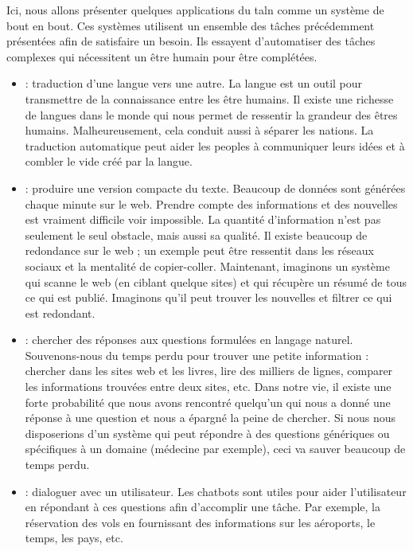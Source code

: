 \documentclass{KodeBook}
\begin{document}
Ici, nous allons présenter quelques applications du \ac{taln} comme un système de bout en bout. 
Ces systèmes utilisent un ensemble des tâches précédemment présentées afin de satisfaire un besoin. 
Ils essayent d'automatiser des tâches complexes qui nécessitent un être humain pour être complétées.
\begin{itemize}
	\item {} : traduction d'une langue vers une autre.
	La langue est un outil pour transmettre de la connaissance entre les être humains. 
	Il existe une richesse de langues dans le monde qui nous permet de ressentir la grandeur des êtres humains.
	Malheureusement, cela conduit aussi à séparer les nations.
	La traduction automatique peut aider les peoples à communiquer leurs idées et à combler le vide créé par la langue. 
	\item {} : produire une version compacte du texte.
	Beaucoup de données sont générées chaque minute sur le web. 
	Prendre compte des informations et des nouvelles est vraiment difficile voir impossible.
	La quantité d'information n'est pas seulement le seul obstacle, mais aussi sa qualité. 
	Il existe beaucoup de redondance sur le web ; un exemple peut être ressentit dans les réseaux sociaux et la mentalité de copier-coller. 
	Maintenant, imaginons un système qui scanne le web (en ciblant quelque sites) et qui récupère un résumé de tous ce qui est publié. 
	Imaginons qu'il peut trouver les nouvelles et filtrer ce qui est redondant.
	
	\item {} : chercher des réponses aux questions formulées en langage naturel.
	Souvenons-nous du temps perdu pour trouver une petite information : chercher dans les sites web et les livres, lire des milliers de lignes, comparer les informations trouvées entre deux sites, etc.
	Dans notre vie, il existe une forte probabilité que nous avons rencontré quelqu'un qui nous a donné une réponse à une question et nous a épargné la peine de chercher.
	Si nous nous disposerions d'un système qui peut répondre à des questions génériques ou spécifiques à un domaine (médecine par exemple), ceci va sauver beaucoup de temps perdu.
	
	\item {} : dialoguer avec un utilisateur. 
	Les chatbots sont utiles pour aider l'utilisateur en répondant à ces questions afin d'accomplir une tâche.
	Par exemple, la réservation des vols en fournissant des informations sur les aéroports, le temps, les pays, etc. 
	

\end{itemize}
\end{document}
